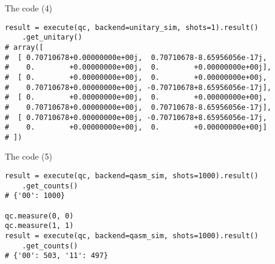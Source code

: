 \begin{frame}[fragile]{The code (4)}
\begin{verbatim}
result = execute(qc, backend=unitary_sim, shots=1).result()
    .get_unitary()
# array([
#  [ 0.70710678+0.00000000e+00j,  0.70710678-8.65956056e-17j,
#    0.        +0.00000000e+00j,  0.        +0.00000000e+00j],
#  [ 0.        +0.00000000e+00j,  0.        +0.00000000e+00j,
#    0.70710678+0.00000000e+00j, -0.70710678+8.65956056e-17j],
#  [ 0.        +0.00000000e+00j,  0.        +0.00000000e+00j,
#    0.70710678+0.00000000e+00j,  0.70710678-8.65956056e-17j],
#  [ 0.70710678+0.00000000e+00j, -0.70710678+8.65956056e-17j,
#    0.        +0.00000000e+00j,  0.        +0.00000000e+00j]
# ])
\end{verbatim}
\end{frame}


\begin{frame}[fragile]{The code (5)}
\begin{verbatim}
result = execute(qc, backend=qasm_sim, shots=1000).result()
    .get_counts()
# {'00': 1000}

qc.measure(0, 0)
qc.measure(1, 1)
result = execute(qc, backend=qasm_sim, shots=1000).result()
    .get_counts()
# {'00': 503, '11': 497}
\end{verbatim}
\end{frame}